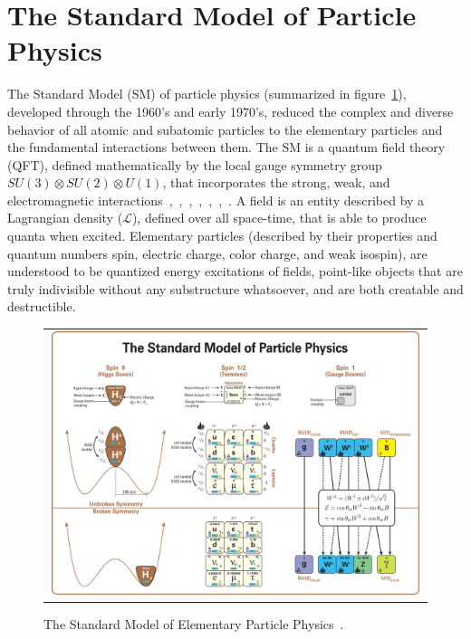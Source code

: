 \section{The Standard Model of Particle Physics}
The Standard Model (SM) of particle physics (summarized in figure~\ref{Standard_Model}), developed through the 1960's and early 1970's, reduced the complex and diverse behavior of all atomic and subatomic particles to the elementary particles and the fundamental interactions between them. 
The SM is a quantum field theory (QFT), defined mathematically by the local gauge symmetry group $SU(3) \otimes SU(2) \otimes U(1)$, that incorporates the strong, weak, and electromagnetic interactions~\cite{GLASHOW1961579},~\cite{PhysRevLett.19.1264},~\cite{doi:10.1142/9789812795915_0034},~\cite{HIGGS1964132},~\cite{PhysRevLett.13.508},~\cite{PhysRevLett.13.321},~\cite{PhysRevLett.30.1343}.
A field is an entity described by a Lagrangian density ($\mathcal{L}$), defined over all space-time, that is able to produce quanta when excited.
Elementary particles (described by their properties and quantum numbers spin, electric charge, color charge, and  weak isospin), are understood to be quantized energy excitations of fields, point-like objects that are truly indivisible without any substructure whatsoever, and are both creatable and destructible.
\begin{figure}[htb]
  \begin{center}
    \begin{tabular}{c}
        \includegraphics[width=0.99\textwidth]{fig_Theory/Standard_Model.png}
    \end{tabular}
    \caption{The Standard Model of Elementary Particle Physics~\cite{StandardModel}.
            }
    \label{Standard_Model}
  \end{center}
\end{figure}

